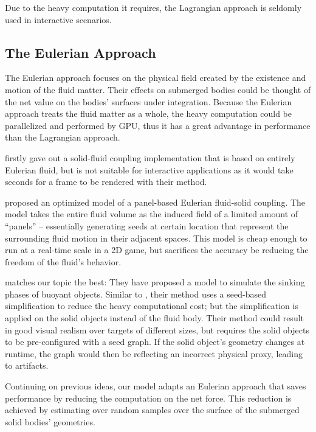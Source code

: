 Due to the heavy computation it requires, the Lagrangian approach is seldomly used in interactive scenarios.

\subsection{The Eulerian Approach}

The Eulerian approach focuses on the physical field created by the existence and motion of the fluid matter.
Their effects on submerged bodies could be thought of the net value on the bodies' surfaces under integration.
Because the Eulerian approach treats the fluid matter as a whole, the heavy computation could be parallelized and performed by GPU, thus it has a great advantage in performance than the Lagrangian approach.

\cite{teng2016eulerian} firstly gave out a solid-fluid coupling implementation that is based on entirely Eulerian fluid, but is not suitable for interactive applications as it would take seconds for a frame to be rendered with their method.

\cite{GER13} proposed an optimized model of a panel-based Eulerian fluid-solid coupling.
The model takes the entire fluid volume as the induced field of a limited amount of ``panels'' -- essentially generating seeds at certain location that represent the surrounding fluid motion in their adjacent spaces.
This model is cheap enough to run at a real-time scale in a 2D game, but sacrifices the accuracy be reducing the freedom of the fluid's behavior.

\cite{BAJ20} matches our topic the best:
They have proposed a model to simulate the sinking phases of buoyant objects.
Similar to \cite{GER13}, their method uses a seed-based simplification to reduce the heavy computational cost; but the simplification is applied on the solid objects instead of the fluid body.
Their method could result in good visual realism over targets of different sizes, but requires the solid objects to be pre-configured with a seed graph.
If the solid object's geometry changes at runtime, the graph would then be reflecting an incorrect physical proxy, leading to artifacts.

Continuing on previous ideas, our model adapts an Eulerian approach that saves performance by reducing the computation on the net force.
This reduction is achieved by estimating over random samples over the surface of the submerged solid bodies' geometries.